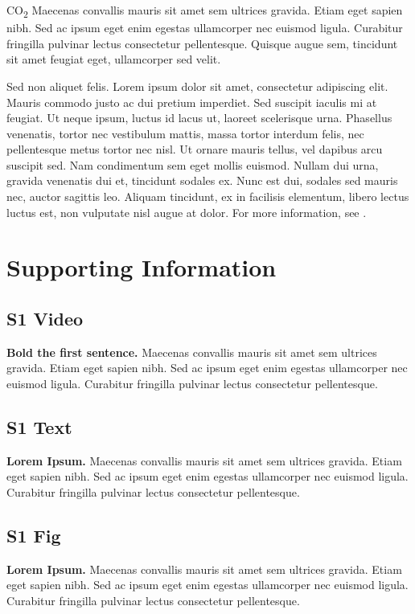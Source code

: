 \documentclass[10pt,letterpaper]{article}
\begin{document}
CO\textsubscript{2} Maecenas convallis mauris sit amet sem ultrices gravida. Etiam eget sapien nibh. Sed ac ipsum eget enim egestas ullamcorper nec euismod ligula. Curabitur fringilla pulvinar lectus consectetur pellentesque. Quisque augue sem, tincidunt sit amet feugiat eget, ullamcorper sed velit. 

Sed non aliquet felis. Lorem ipsum dolor sit amet, consectetur adipiscing elit. Mauris commodo justo ac dui pretium imperdiet. Sed suscipit iaculis mi at feugiat. Ut neque ipsum, luctus id lacus ut, laoreet scelerisque urna. Phasellus venenatis, tortor nec vestibulum mattis, massa tortor interdum felis, nec pellentesque metus tortor nec nisl. Ut ornare mauris tellus, vel dapibus arcu suscipit sed. Nam condimentum sem eget mollis euismod. Nullam dui urna, gravida venenatis dui et, tincidunt sodales ex. Nunc est dui, sodales sed mauris nec, auctor sagittis leo. Aliquam tincidunt, ex in facilisis elementum, libero lectus luctus est, non vulputate nisl augue at dolor. For more information, see .

\section*{Supporting Information}

\subsection*{S1 Video}
\label{S1_Video}
{\bf Bold the first sentence.}  Maecenas convallis mauris sit amet sem ultrices gravida. Etiam eget sapien nibh. Sed ac ipsum eget enim egestas ullamcorper nec euismod ligula. Curabitur fringilla pulvinar lectus consectetur pellentesque.

\subsection*{S1 Text}
\label{S1_Text}
{\bf Lorem Ipsum.} Maecenas convallis mauris sit amet sem ultrices gravida. Etiam eget sapien nibh. Sed ac ipsum eget enim egestas ullamcorper nec euismod ligula. Curabitur fringilla pulvinar lectus consectetur pellentesque.

\subsection*{S1 Fig}
\label{S1_Fig}
{\bf Lorem Ipsum.} Maecenas convallis mauris sit amet sem ultrices gravida. Etiam eget sapien nibh. Sed ac ipsum eget enim egestas ullamcorper nec euismod ligula. Curabitur fringilla pulvinar lectus consectetur pellentesque.
\end{document}
